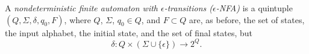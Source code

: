 

\setcounter{section}{1}
\setcounter{subsection}{4}
\setcounter{dfn}{12}

\begin{dfn}
\label{dfn:ENFA}
A \emph{nondeterministic finite automaton with $\epsilon$-transitions ($\epsilon$-NFA)}
is a quintuple $(Q, \Sigma, \delta, q_0, F)$, where $Q$, $\Sigma$, $q_0 \in Q$, and $F \subset Q$
are, as before, the set of states, the input alphabet, the initial state, and the set of final states,
but
\[
\delta \colon Q \times (\Sigma \cup \{\epsilon\}) \to 2^Q.
\]
\end{dfn}

